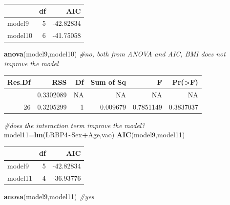 \documentclass[
]{article}
\newenvironment{Shaded}{\begin{snugshade}}{\end{snugshade}}
\newcommand{\CommentTok}[1]{\textcolor[rgb]{0.56,0.35,0.01}{\textit{#1}}}
\newcommand{\FunctionTok}[1]{\textcolor[rgb]{0.13,0.29,0.53}{\textbf{#1}}}
\newcommand{\NormalTok}[1]{#1}
\newcommand{\OtherTok}[1]{\textcolor[rgb]{0.56,0.35,0.01}{#1}}
\newcommand{\SpecialCharTok}[1]{\textcolor[rgb]{0.81,0.36,0.00}{\textbf{#1}}}
\begin{document}
\begin{longtable}[]{@{}lrr@{}}
\toprule\noalign{}
& df & AIC \\
\midrule\noalign{}
\endhead
\bottomrule\noalign{}
\endlastfoot
model9 & 5 & -42.82834 \\
model10 & 6 & -41.75058 \\
\end{longtable}

\begin{Shaded}
\begin{Highlighting}[]
\FunctionTok{anova}\NormalTok{(model9,model10) }\CommentTok{\#no, both from ANOVA and AIC, BMI does not improve the model}
\end{Highlighting}
\end{Shaded}

\begin{longtable}[]{@{}rrrrrr@{}}
\toprule\noalign{}
Res.Df & RSS & Df & Sum of Sq & F & Pr(\textgreater F) \\
\midrule\noalign{}
\endhead
\bottomrule\noalign{}
\endlastfoot
27 & 0.3302089 & NA & NA & NA & NA \\
26 & 0.3205299 & 1 & 0.009679 & 0.7851149 & 0.3837037 \\
\end{longtable}

\begin{Shaded}
\begin{Highlighting}[]
\CommentTok{\#does the interaction term improve the model?}
\NormalTok{model11}\OtherTok{=}\FunctionTok{lm}\NormalTok{(LRBP4}\SpecialCharTok{\textasciitilde{}}\NormalTok{Sex}\SpecialCharTok{+}\NormalTok{Age,vao)}
\FunctionTok{AIC}\NormalTok{(model9,model11)}
\end{Highlighting}
\end{Shaded}

\begin{longtable}[]{@{}lrr@{}}
\toprule\noalign{}
& df & AIC \\
\midrule\noalign{}
\endhead
\bottomrule\noalign{}
\endlastfoot
model9 & 5 & -42.82834 \\
model11 & 4 & -36.93776 \\
\end{longtable}

\begin{Shaded}
\begin{Highlighting}[]
\FunctionTok{anova}\NormalTok{(model9,model11) }\CommentTok{\#yes}
\end{Highlighting}
\end{Shaded}
\end{document}

